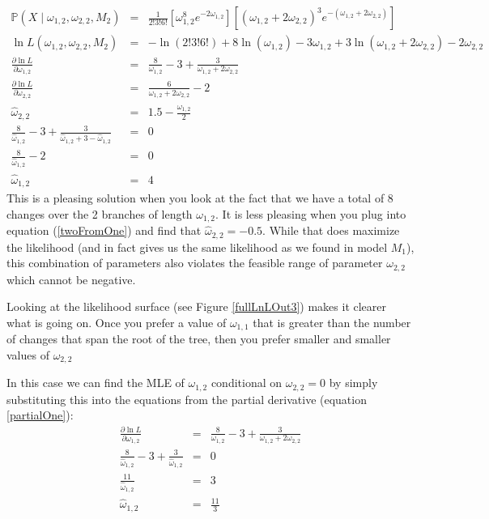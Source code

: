 \documentclass[11pt]{article}
\renewcommand{\Pr}{\mathbb{P}}
\begin{document}
\begin{eqnarray}
\Pr(X\mid \omega_{1,2},\omega_{2,2}, M_2)& = &
 \frac{1}{2!3!6!}\left[\omega_{1,2}^8e^{-2\omega_{1,2}}\right]
\left[\left(\omega_{1,2}+2\omega_{2,2}\right)^3e^{-(\omega_{1,2}+2\omega_{2,2})}\right] \\
\ln L(\omega_{1,2},\omega_{2,2}, M_2) & = &
-\ln(2!3!6!)+ 8 \ln(\omega_{1,2}) -3\omega_{1,2} +
3\ln\left(\omega_{1,2}+2\omega_{2,2}\right) - 2\omega_{2,2}\\
\frac{\partial\ln L}{\partial\omega_{1,2}} & = & 
\frac{8}{\omega_{1,2}} -3 + \frac{3}{\omega_{1,2} + 2\omega_{2,2}} \label{partialOne}\\
\frac{\partial\ln L}{\partial\omega_{2,2}} & = & 
\frac{6}{\omega_{1,2} + 2\omega_{2,2}} -2 \\
\hat{\omega}_{2,2} & = & 1.5 - \frac{\omega_{1,2}}{2} \label{twoFromOne}\\
\frac{8}{\hat{\omega}_{1,2}} -3 + \frac{3}{\hat{\omega}_{1,2} + 3 - \hat{\omega}_{1,2}} & = & 0 \\
\frac{8}{\hat{\omega}_{1,2}} -2 & = & 0 \\
\hat{\omega}_{1,2} &= & 4
\end{eqnarray}
This is a pleasing solution when you look at the fact that 
we have a total of 8 changes over the 2 branches of length $\omega_{1,2}$.
It is less pleasing when you plug into equation (\ref{twoFromOne})
and find that $\hat{\omega}_{2,2} = -0.5$.
While that does maximize the likelihood (and in fact gives us the
same likelihood as we found in model $M_1$), this
combination of parameters also violates the feasible range of parameter $\omega_{2,2}$ which cannot be negative.

Looking at the likelihood surface (see Figure \ref{fullLnLOut3}) makes it clearer what is going on.
Once you prefer a value of $\omega_{1,1}$ that is greater
    than the number of changes that span the root of the tree,
    then you prefer smaller and smaller values of $\omega_{2,2}$

In this case we can find the MLE of $\omega_{1,2}$ conditional
    on $\omega_{2,2} = 0$ by simply substituting this
 into the equations from the partial derivative (equation
 \ref{partialOne}):
\begin{eqnarray}
\frac{\partial\ln L}{\partial\omega_{1,2}} & = & 
\frac{8}{\omega_{1,2}} -3 + \frac{3}{\omega_{1,2} + 2\omega_{2,2}} \\
\frac{8}{\hat{\omega}_{1,2}} -3 + \frac{3}{\hat{\omega}_{1,2}} & = & 0\\
\frac{11}{\hat{\omega}_{1,2}} & = & 3\\
\hat{\omega}_{1,2}&  = & \frac{11}{3}
\end{eqnarray}
\end{document}
